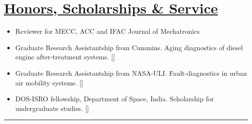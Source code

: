 \section*{\underline{Honors, Scholarships \& Service}}
\begin{itemize}
        \item Reviewer for MECC, ACC and IFAC Journal of Mechatronics
        \item Graduate Research Assistantship from Cummins. Aging diagnostics of diesel engine after-treatment systems.
        []
        \item Graduate Research Assistantship from NASA-ULI. Fault-diagnostics in urban air mobility systems.
        []
        \item DOS-ISRO fellowship, Department of Space, India. Scholarship for undergraduate studies.
        []
\end{itemize}
\noindent\rule{\textwidth}{0.4pt}

